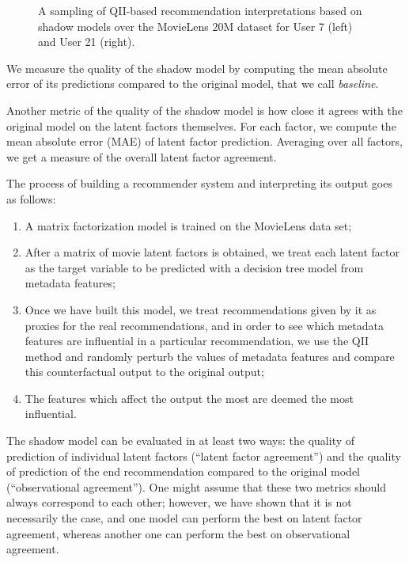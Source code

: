 \begin{figure}[t!]
  \caption{\label{fig:results:qii}A sampling of QII-based
    recommendation interpretations based on shadow models over the
    MovieLens 20M dataset for User 7 (left) and User 21 (right).
  }
\end{figure}


We measure the quality of the shadow model by computing the mean
absolute error of its predictions compared to the original model,
that we call \emph{baseline}.

Another metric of the quality of the shadow model is how close it
agrees with the original model on the latent factors themselves.
For each factor, we compute the mean absolute error (MAE) of latent
factor prediction. 
Averaging over all factors, we get a measure of the overall latent
factor agreement.


















The process of building a recommender system and interpreting its output goes
as follows:

\begin{enumerate}
	\item
		A matrix factorization model is trained on the MovieLens data
		set;
	\item
		After a matrix of movie latent factors is obtained, we treat
		each latent factor as the target variable to be predicted with
		a decision tree model from metadata features;
	\item
		Once we have built this model, we treat recommendations given by
		it as proxies for the real recommendations, and in order to see
		which metadata features are influential in a particular
		recommendation, we use the QII method and randomly perturb the
		values of metadata features and compare this counterfactual
		output to the original output;
	\item
		The features which affect the output the most are deemed the
		most influential.
\end{enumerate}

The shadow model can be evaluated in at least two ways: the quality of
prediction of individual latent factors (``latent factor agreement'') and the
quality of prediction of the end recommendation compared to the original model
(``observational agreement''). One might assume that these two metrics should
always correspond to each other; however, we have shown that it is not
necessarily the case, and one model can perform the best on latent factor
agreement, whereas another one can perform the best on observational agreement.


